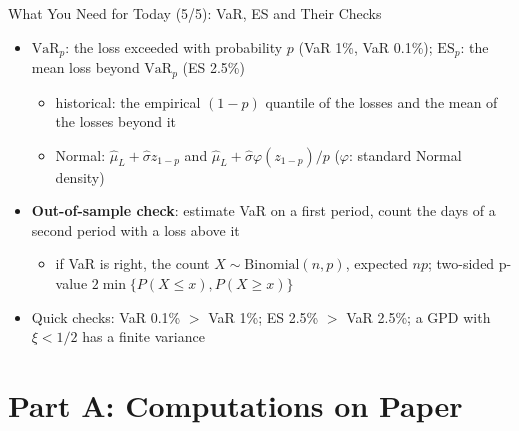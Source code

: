 \begin{frame}{What You Need for Today (5/5): VaR, ES and Their Checks}
\itemsize{\small}
\begin{itemize}
    \item $\mathrm{VaR}_p$: the loss exceeded with probability $p$ (VaR 1\%, VaR 0.1\%); $\mathrm{ES}_p$: the mean loss beyond $\mathrm{VaR}_p$ (ES 2.5\%)
    \begin{itemize}
        \item historical: the empirical $(1 - p)$ quantile of the losses and the mean of the losses beyond it
        \item Normal: $\hat\mu_L + \hat\sigma z_{1-p}$ and $\hat\mu_L + \hat\sigma\varphi(z_{1-p})/p$ ($\varphi$: standard Normal density)
    \end{itemize}
    \item \textbf{Out-of-sample check}: estimate VaR on a first period, count the days of a second period with a loss above it
    \begin{itemize}
        \item if VaR is right, the count $X \sim \mathrm{Binomial}(n, p)$, expected $np$; two-sided p-value $2\min\{P(X \le x), P(X \ge x)\}$
    \end{itemize}
    \item Quick checks: VaR 0.1\% $>$ VaR 1\%; ES 2.5\% $>$ VaR 2.5\%; a GPD with $\xi < 1/2$ has a finite variance
\end{itemize}
\end{frame}


\section{Part A: Computations on Paper}


